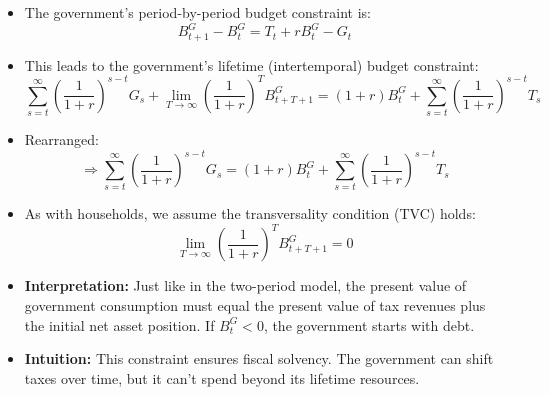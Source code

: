 \documentclass[12pt]{article}
\begin{document}
\begin{itemize}
\item The government’s period-by-period budget constraint is:
\[
B^G_{t+1} - B^G_t = T_t + r B^G_t - G_t
\]

\item This leads to the government’s lifetime (intertemporal) budget constraint:
\[
\sum_{s=t}^{\infty} \left( \frac{1}{1 + r} \right)^{s - t} G_s + \lim_{T \to \infty} \left( \frac{1}{1 + r} \right)^T B^G_{t+T+1}
= (1 + r) B^G_t + \sum_{s=t}^{\infty} \left( \frac{1}{1 + r} \right)^{s - t} T_s
\]

\item Rearranged:
\[
\Rightarrow \sum_{s=t}^{\infty} \left( \frac{1}{1 + r} \right)^{s - t} G_s
= (1 + r) B^G_t + \sum_{s=t}^{\infty} \left( \frac{1}{1 + r} \right)^{s - t} T_s
\]

\item As with households, we assume the transversality condition (TVC) holds:
\[
\lim_{T \to \infty} \left( \frac{1}{1 + r} \right)^T B^G_{t+T+1} = 0
\]

\item \textbf{Interpretation:} Just like in the two-period model, the present value of government consumption must equal the present value of tax revenues plus the initial net asset position. If $B^G_t < 0$, the government starts with debt.

\item \textbf{Intuition:} This constraint ensures fiscal solvency. The government can shift taxes over time, but it can’t spend beyond its lifetime resources.
\end{itemize}
\end{document}
